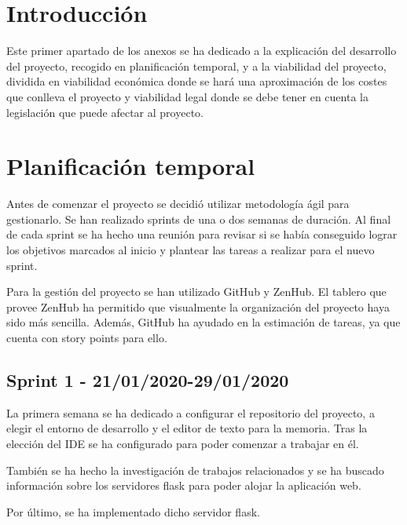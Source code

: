 
\section{Introducción}
Este primer apartado de los anexos se ha dedicado a la explicación del desarrollo del proyecto, recogido en planificación temporal, y a la viabilidad del proyecto, dividida en viabilidad económica donde se hará una aproximación de los costes que conlleva el proyecto y viabilidad legal donde se debe tener en cuenta la legislación que puede afectar al proyecto.

\section{Planificación temporal}
Antes de comenzar el proyecto se decidió utilizar metodología ágil para gestionarlo.
Se han realizado sprints de una o dos semanas de duración. Al final de cada sprint se ha hecho una reunión para revisar si se había conseguido lograr los objetivos marcados al inicio y plantear las tareas a realizar para el nuevo sprint.

Para la gestión del proyecto se han utilizado GitHub y ZenHub. El tablero que provee ZenHub ha permitido que visualmente la organización del proyecto haya sido más sencilla. Además, GitHub ha ayudado en la estimación de tareas, ya que cuenta con story points para ello.
\newpage
\subsection{Sprint 1 - 21/01/2020-29/01/2020}
La primera semana se ha dedicado a configurar el repositorio del proyecto, a elegir el entorno de desarrollo y el editor de texto para la memoria. 
Tras la elección del IDE se ha configurado para poder comenzar a trabajar en él.

También se ha hecho la investigación de trabajos relacionados y se ha buscado información sobre los servidores flask para poder alojar la aplicación web.

Por último, se ha implementado dicho servidor flask.


